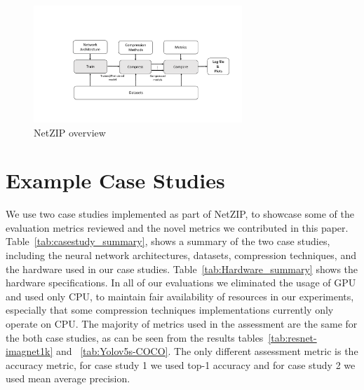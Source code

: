 \begin{figure}[h]
    \centering
    \includegraphics[width=0.7\textwidth]{other/figures/NetZIP_overview.pdf}
    \caption{NetZIP overview}
    \label{fig:Netzip}
\end{figure}



\section{Example Case Studies} \label{sec:casestudies}
We use two case studies implemented as part of NetZIP, to showcase some of the evaluation metrics reviewed and the novel metrics we contributed in this paper. 
%
Table~\ref{tab:casestudy_summary}, shows a summary of the two case studies, including the neural network architectures, datasets, compression techniques, and the hardware used in our case studies.
%
Table~\ref{tab:Hardware_summary} shows the hardware specifications. 
%
In all of our evaluations we eliminated the usage of GPU and used only CPU, to maintain fair availability of resources in our experiments, especially that some compression techniques implementations currently only operate on CPU. 
%
The majority of metrics used in the assessment are the same for the both case studies, as can be seen from the results tables~\ref{tab:resnet-imagnet1k} and ~\ref{tab:Yolov5s-COCO}. The only different assessment metric is the accuracy metric, for case study 1 we used top-1 accuracy and for case study 2 we used mean average precision.

